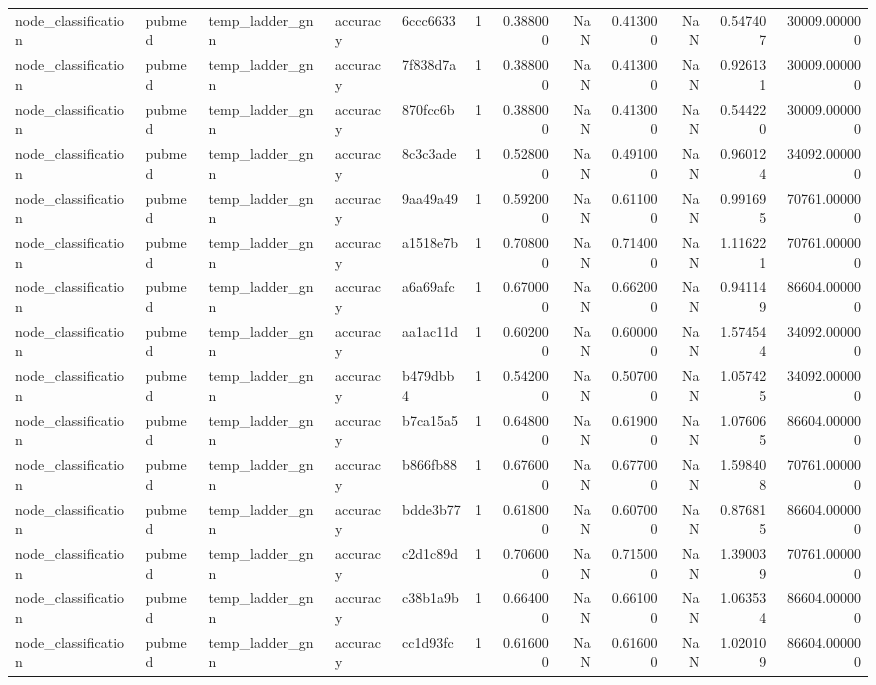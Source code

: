 \begin{tabular}{lllllrrrrrrr}
node_classification & pubmed & temp_ladder_gnn & accuracy & 6ccc6633 & 1 & 0.388000 & NaN & 0.413000 & NaN & 0.547407 & 30009.000000 \\
node_classification & pubmed & temp_ladder_gnn & accuracy & 7f838d7a & 1 & 0.388000 & NaN & 0.413000 & NaN & 0.926131 & 30009.000000 \\
node_classification & pubmed & temp_ladder_gnn & accuracy & 870fcc6b & 1 & 0.388000 & NaN & 0.413000 & NaN & 0.544220 & 30009.000000 \\
node_classification & pubmed & temp_ladder_gnn & accuracy & 8c3c3ade & 1 & 0.528000 & NaN & 0.491000 & NaN & 0.960124 & 34092.000000 \\
node_classification & pubmed & temp_ladder_gnn & accuracy & 9aa49a49 & 1 & 0.592000 & NaN & 0.611000 & NaN & 0.991695 & 70761.000000 \\
node_classification & pubmed & temp_ladder_gnn & accuracy & a1518e7b & 1 & 0.708000 & NaN & 0.714000 & NaN & 1.116221 & 70761.000000 \\
node_classification & pubmed & temp_ladder_gnn & accuracy & a6a69afc & 1 & 0.670000 & NaN & 0.662000 & NaN & 0.941149 & 86604.000000 \\
node_classification & pubmed & temp_ladder_gnn & accuracy & aa1ac11d & 1 & 0.602000 & NaN & 0.600000 & NaN & 1.574544 & 34092.000000 \\
node_classification & pubmed & temp_ladder_gnn & accuracy & b479dbb4 & 1 & 0.542000 & NaN & 0.507000 & NaN & 1.057425 & 34092.000000 \\
node_classification & pubmed & temp_ladder_gnn & accuracy & b7ca15a5 & 1 & 0.648000 & NaN & 0.619000 & NaN & 1.076065 & 86604.000000 \\
node_classification & pubmed & temp_ladder_gnn & accuracy & b866fb88 & 1 & 0.676000 & NaN & 0.677000 & NaN & 1.598408 & 70761.000000 \\
node_classification & pubmed & temp_ladder_gnn & accuracy & bdde3b77 & 1 & 0.618000 & NaN & 0.607000 & NaN & 0.876815 & 86604.000000 \\
node_classification & pubmed & temp_ladder_gnn & accuracy & c2d1c89d & 1 & 0.706000 & NaN & 0.715000 & NaN & 1.390039 & 70761.000000 \\
node_classification & pubmed & temp_ladder_gnn & accuracy & c38b1a9b & 1 & 0.664000 & NaN & 0.661000 & NaN & 1.063534 & 86604.000000 \\
node_classification & pubmed & temp_ladder_gnn & accuracy & cc1d93fc & 1 & 0.616000 & NaN & 0.616000 & NaN & 1.020109 & 86604.000000 \\

\end{tabular}
